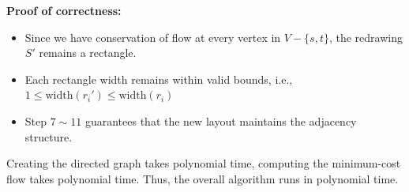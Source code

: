 \documentclass[11pt]{article}
\begin{document}
\begin{description}
\textbf{Proof of correctness:}
\begin{itemize}
  \item Since we have conservation of flow at every vertex in $V-\{s,t\}$, 
  the redrawing \( S' \) remains a rectangle.
  \item Each rectangle width remains within valid bounds, i.e., 
  \( 1 \le \text{width}(r_i') \le \text{width}(r_i) \)
  \item Step \(7\sim11\) guarantees that the new layout maintains the adjacency structure.
\end{itemize}

Creating the directed graph takes polynomial time, computing the minimum-cost flow takes
polynomial time. Thus, the overall algorithm runs in polynomial time.

\end{description}
\end{document}
